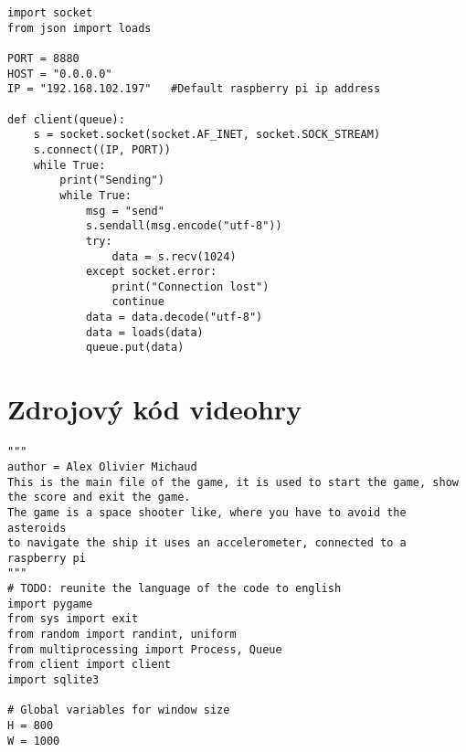 \documentclass[12pt]{report}			%
\begin{document}
\begin{appendices}
\begin{lstlisting}[title={Program client.py}, caption={client.py},  label={lst:client}]
import socket
from json import loads

PORT = 8880
HOST = "0.0.0.0"
IP = "192.168.102.197"   #Default raspberry pi ip address

def client(queue):
    s = socket.socket(socket.AF_INET, socket.SOCK_STREAM)
    s.connect((IP, PORT))
    while True:
        print("Sending")
        while True:
            msg = "send"
            s.sendall(msg.encode("utf-8"))
            try:
                data = s.recv(1024)
            except socket.error:
                print("Connection lost")
                continue
            data = data.decode("utf-8")
            data = loads(data)
            queue.put(data)

\end{lstlisting}
	\chapter{Zdrojový kód videohry}
	
\begin{lstlisting}[title={Program hra.py}, caption={hra.py},  label={lst:hra}]
"""
author = Alex Olivier Michaud
This is the main file of the game, it is used to start the game, show the score and exit the game.
The game is a space shooter like, where you have to avoid the asteroids
to navigate the ship it uses an accelerometer, connected to a raspberry pi
"""
# TODO: reunite the language of the code to english
import pygame
from sys import exit
from random import randint, uniform
from multiprocessing import Process, Queue
from client import client
import sqlite3

# Global variables for window size
H = 800
W = 1000


\end{lstlisting}
\end{appendices}
\end{document}
